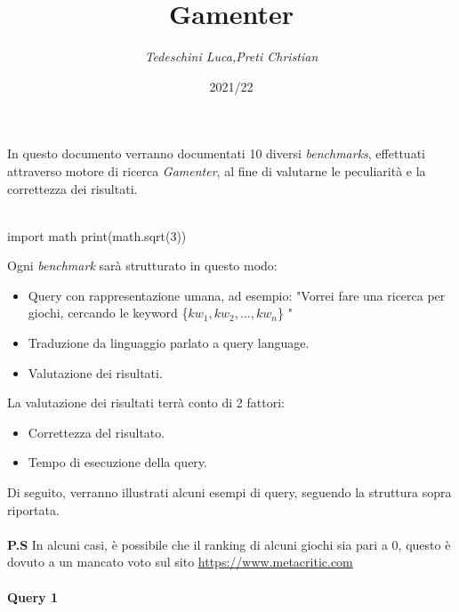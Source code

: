\documentclass[12pt]{article}
\begin{document}
 \noindent
\title{\Huge \textbf{Gamenter}}
\author{\textit{Tedeschini Luca,Preti Christian}}
\date{2021/22}
\maketitle \noindent
In questo documento verranno documentati 10 diversi \textit{benchmarks}, effettuati attraverso motore di ricerca \textit{Gamenter}, al fine di valutarne le peculiarità e la correttezza dei risultati.
\\ \\

\begin{pyconsole}
import math
print(math.sqrt(3))
\end{pyconsole}

Ogni \textit{benchmark} sarà strutturato in questo modo:

\begin{itemize}
	\item Query con rappresentazione umana, ad esempio: "Vorrei fare una ricerca per giochi, cercando le keyword \{$kw_1, kw_2, ..., kw_n$\} "
	
	\item Traduzione da linguaggio parlato a query language.

	\item Valutazione dei risultati.

\end{itemize}

\noindent La valutazione dei risultati terrà conto di 2 fattori:

\begin{itemize}
	\item Correttezza del risultato.
	\item Tempo di esecuzione della query.
\end{itemize} 

\noindent Di seguito, verranno illustrati alcuni esempi di query, seguendo la struttura sopra riportata. \\ \\
\textbf{P.S} In alcuni casi, è possibile che il ranking di alcuni giochi sia pari a 0, questo è dovuto a un mancato voto sul sito \url{https://www.metacritic.com}
\pagebreak

\paragraph{\LARGE{Query 1}} ~ \\ \\
\end{document}
